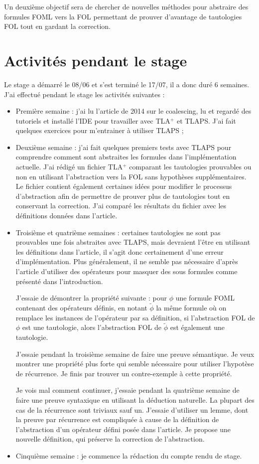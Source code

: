 \documentclass[12pt]{article}
\begin{document}
Un deuxième objectif sera de chercher de nouvelles méthodes pour abstraire des formules FOML vers la FOL permettant de prouver d'avantage de tautologies FOL tout en gardant la correction.

\section{Activités pendant le stage}

Le stage a démarré le 08/06 et s'est terminé le 17/\textcolor{myblue}{07}, il a donc duré 6 semaines.
J'ai effectué pendant le stage les activités suivantes :
\begin{itemize}
\item
  Première semaine :
  j'ai lu l'article de 2014 sur le coalescing, lu et regardé des tutoriels et installé l'IDE pour travailler avec TLA$^+$ et TLAPS. J'ai fait quelques exercices pour m'entrainer à utiliser TLAPS ;
\item
  Deuxième semaine :
  j'ai fait quelques premiers tests avec TLAPS pour comprendre comment sont abstraites les formules dans l'implémentation actuelle.
  J'ai rédigé un fichier TLA$^+$ comparant les tautologies prouvables ou non en utilisant l'abstraction vers la FOL sans hypothèses supplémentaires.
  Le fichier contient également certaines idées pour modifier le processus d'abstraction afin de permettre de prouver plus de tautologies tout en conservant la correction.
  J'ai comparé les résultats du fichier avec les définitions données dans l'article.
\item
  Troisième et quatrième semaines :
  certaines tautologies ne sont pas prouvables une fois abstraites avec TLAPS, mais devraient l'être en utilisant les définitions dans l'article, il s'agit donc certainement d'une erreur d'implémentation.
  Plus généralement, il ne semble pas nécessaire d'après l'article d'utiliser des opérateurs pour masquer des sous formules comme présenté dans l'introduction.
  
  J'essaie de démontrer la propriété suivante : pour $\phi$ une formule FOML contenant des opérateurs définis, en notant $\widetilde{\phi}$ la même formule où on remplace les instances de l'opérateur par sa définition, si l'abstraction FOL de $\phi$ est une tautologie, alors l'abstraction FOL de $\widetilde{\phi}$ est également une tautologie.

  J'essaie pendant la troisième semaine de faire une preuve sémantique.
  Je veux montrer une propriété plus forte qui semble nécessaire pour utiliser l'hypotèse de récurrence.
  Je finis par trouver un contre-exemple à cette propriété.

  Je vois mal comment continuer, j'essaie pendant la quatrième semaine de faire une preuve syntaxique en utilisant la déduction naturelle.
  La plupart des cas de la récurrence sont triviaux sauf un.
  J'essaie d'utiliser un lemme, dont la preuve par récurrence est compliquée à cause de la définition de l'abstraction d'un opérateur défini posée dans l'article.
  Je propose une nouvelle définition, qui préserve la correction de l'abstraction.
\item
  Cinquième semaine :
  je commence la rédaction du compte rendu de stage.
\end{itemize}
\end{document}
